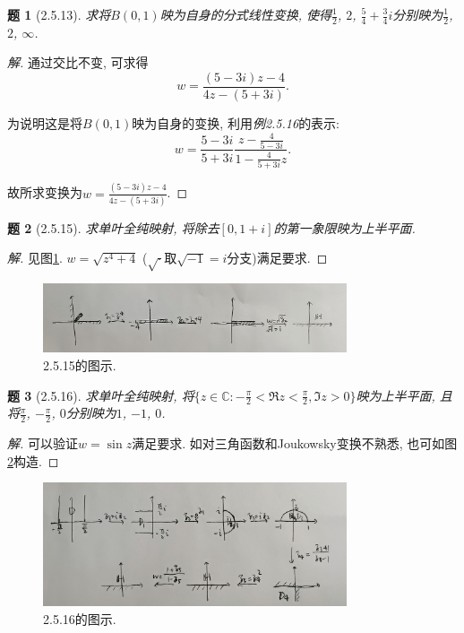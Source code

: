 \documentclass{article}[a4paper, 12pt]
\newtheorem{problem}{题}
\newenvironment{solution}{\begin{proof}[解]}{\end{proof}}
\begin{document}
\begin{problem}[2.5.13]
  求将\(B(0,1)\)映为自身的分式线性变换, 使得\(\frac12\), \(2\), \(\frac54+\frac34i\)分别映为\(\frac12\), \(2\), \(\infty\).
\end{problem}

\begin{solution}
  通过交比不变, 可求得\[w=\frac{(5-3i)z-4}{4z-(5+3i)}.\]

  为说明这是将\(B(0,1)\)映为自身的变换, 利用\emph{例2.5.16}的表示:
  \[w=\frac{5-3i}{5+3i}\frac{z-\frac{4}{5-3i}}{1-\frac{4}{5+3i}z}.\]

  故所求变换为\(w=\frac{(5-3i)z-4}{4z-(5+3i)}\).
\end{solution}

\begin{problem}[2.5.15]
  求单叶全纯映射, 将除去\([0,1+i]\)的第一象限映为上半平面.
\end{problem}

\begin{solution}
  见图\ref{fig:2.5.15}. \(w=\sqrt{z^4+4}\) (\(\sqrt{\cdot}\)取\(\sqrt{-1}=i\)分支)满足要求.
\end{solution}

\begin{figure}[htbp]
  \centering
  \includegraphics[width=0.8\textwidth]{images/2.5.15.jpg}
  \caption{2.5.15的图示.}
  \label{fig:2.5.15}
\end{figure}

\begin{problem}[2.5.16]
  求单叶全纯映射, 将\(\{z\in\mathbb{C}:-\frac\pi2<\Re z<\frac\pi2,\Im z>0\}\)映为上半平面, 且将\(\frac\pi2\), \(-\frac\pi2\), \(0\)分别映为\(1\), \(-1\), \(0\).
\end{problem}

\begin{solution}
  可以验证\(w=\sin z\)满足要求. 如对三角函数和Joukowsky变换不熟悉, 也可如图\ref{fig:2.5.16}构造.
\end{solution}

\begin{figure}[htbp]
  \centering
  \includegraphics[width=0.8\textwidth]{images/2.5.16.jpg}
  \caption{2.5.16的图示.}
  \label{fig:2.5.16}
\end{figure}
\end{document}
